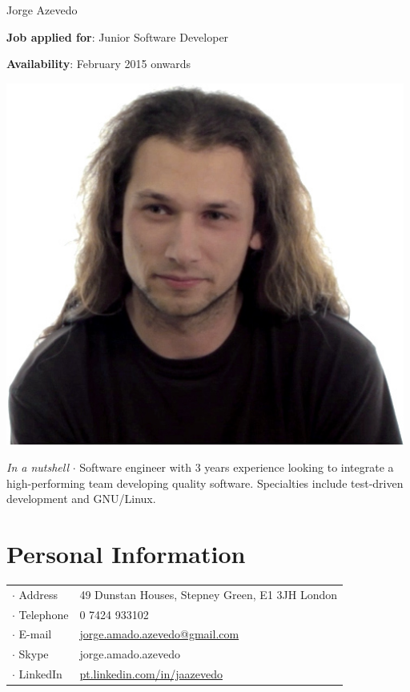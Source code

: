 



\topSection
{
	{\Huge Jorge Azevedo}

	\vspace{1.5mm}
	\vspace*{10mm}

	\textbf{Job applied for}: Junior Software Developer

	\textbf{Availability}: February 2015 onwards
} {
	\includegraphics[width=0.985\textwidth]{img/photo}
}

\emph{In a nutshell} $\cdot$ Software engineer with 3 years experience looking
to integrate a high-performing team developing quality software. Specialties
include test-driven development and GNU/Linux.

\section*{Personal Information}

{
\begin{tabular}[t]{@{}l l}
	$\cdot$  Address & 49 Dunstan Houses, Stepney Green, E1 3JH London \\
	$\cdot$  Telephone & 0 7424 933102 \\
	$\cdot$  E-mail & \href{mailto:jorge.amado.azevedo@gmail.com}{jorge.amado.azevedo@gmail.com} \\
	$\cdot$  Skype & jorge.amado.azevedo\\
	$\cdot$  LinkedIn & \href{http://pt.linkedin.com/in/jaazevedo}{pt.linkedin.com/in/jaazevedo}\\
\end{tabular}
}

